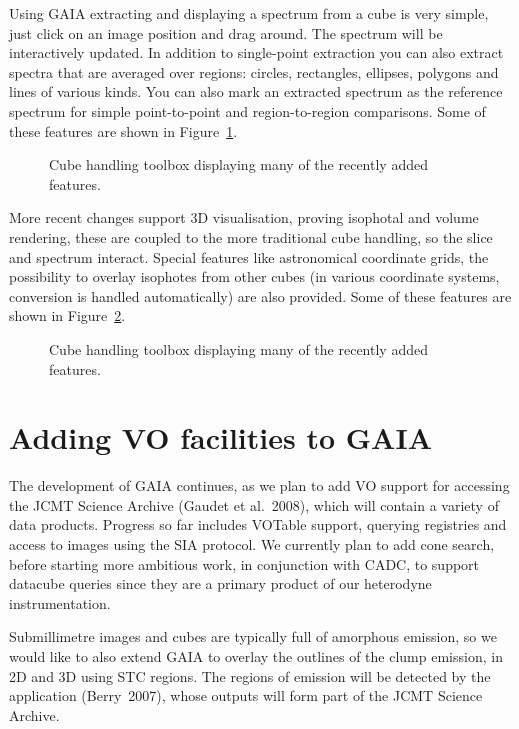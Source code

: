 \documentclass[11pt,twoside]{article}  %
\begin{document}
Using GAIA extracting and displaying a spectrum from a cube is very simple,
just click on an image position and drag around. The spectrum will be
interactively updated.  In addition to single-point extraction you can also
extract spectra that are averaged over regions: circles, rectangles, ellipses,
polygons and lines of various kinds. You can also mark an extracted spectrum
as the reference spectrum for simple point-to-point and region-to-region
comparisons. Some of these features are shown in Figure~\ref{F3-fig1}.

\begin{figure}
\caption{Cube handling toolbox displaying many of the recently added features.}
\label{F3-fig1}
\end{figure}

More recent changes support 3D visualisation, proving isophotal and volume
rendering, these are coupled to the more traditional cube handling, so the
slice and spectrum interact. Special features like astronomical coordinate
grids, the possibility to overlay isophotes from other cubes (in various
coordinate systems, conversion is handled automatically) are also provided.
Some of these features are shown in Figure~\ref{F3-fig2}.

\begin{figure}
\caption{Cube handling toolbox displaying many of the recently added features.}
\label{F3-fig2}
\end{figure}

\section{Adding VO facilities to GAIA}

The development of GAIA continues, as we plan to add VO support for accessing
the JCMT Science Archive (Gaudet et al.\ 2008), which will contain a variety
of data products. Progress so far includes VOTable support, querying
registries and access to images using the SIA protocol. We currently plan to
add cone search, before starting more ambitious work, in conjunction with
CADC, to support datacube queries since they are a primary product of our
heterodyne instrumentation.

Submillimetre images and cubes are typically full of amorphous emission, so we
would like to also extend GAIA to overlay the outlines of the clump emission,
in 2D and 3D using STC regions. The regions of emission will be detected by
the  application
(Berry\ 2007), whose outputs will form part of the JCMT Science Archive.
\end{document}

